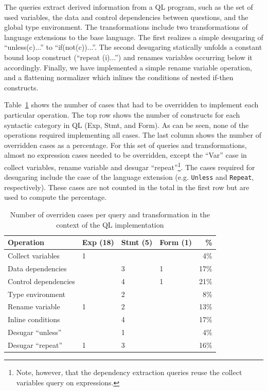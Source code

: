 The queries extract derived information from a QL program, such as the set of used variables, the data and control dependencies between questions, and the global type environment.
The transformations include two transformations of language extensions to the base language.
The first realizes a simple desugaring of ``unless(c){...}'' to ``if(not(c)){...}''.
The second desugaring statically unfolds a constant bound loop construct (``repeat (i){...}'') and renames variables occurring below it accordingly.
Finally, we have implemented a simple rename variable operation, and a flattening normalizer which inlines the conditions of nested if-then constructs.

Table~\ref{TBL:qlresults} shows the number of cases that had to be overridden to implement each particular operation. The top row shows the number of  constructs for each syntactic category in QL (Exp, Stmt, and Form).
As can be seen, none of the operations required implementing all cases.
The last column shows the number of overridden cases as a percentage.
For this set of queries and transformations, almost no expression cases needed to be overridden, except the ``Var'' case in collect variables, rename variable and desugar ``repeat''\footnote{Note, however, that the dependency extraction queries reuse the collect variables query on expressions.}.
The cases required for desugaring include the case of the language extension (e.g. \lstinline{Unless} and \lstinline{Repeat}, respectively). These cases are not counted in the total in the first row but are used to compute the percentage.

\begin{table}[t]
  \centering\small
  \begin{tabular}{@{}llllr@{}}\toprule
    Operation            & Exp (18) & Stmt (5) & Form (1) & \%     \\\hline
    Collect variables    & 1        &          &          & 4\%  \\
    Data dependencies    &          & 3        & 1        & 17\% \\
    Control dependencies &          & 4        & 1        & 21\% \\
    Type environment     &          & 2        &          & 8\%  \\\hline
    Rename variable      & 1        & 2        &          & 13\% \\
    Inline conditions    &          & 4        &          & 17\% \\
    Desugar ``unless''   &          & 1        &          & 4\%  \\
    Desugar ``repeat''   & 1        & 3        &          & 16\% \\\bottomrule
  \end{tabular}
\nocaptionrule   \caption{Number of overriden cases per query and transformation in
    the context of the QL implementation\label{TBL:qlresults}}
\end{table}

